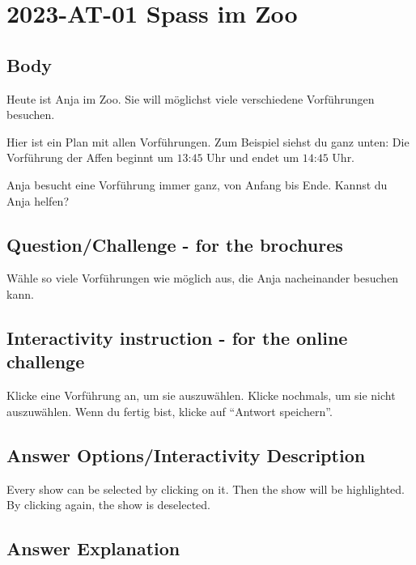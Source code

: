 \documentclass[a4paper,11pt]{report}
\newcommand{\taskGraphicsFolder}{..}
\begin{document}
\section*{\centering{} 2023-AT-01 Spass im Zoo}


\subsection*{Body}

Heute ist Anja im Zoo. Sie will möglichst viele verschiedene Vorführungen besuchen.

Hier ist ein Plan mit allen Vorführungen.
Zum Beispiel siehst du ganz unten:
Die Vorführung der Affen beginnt um $13$:$45$ Uhr und endet um $14$:$45$ Uhr.

{\centering%
\par}

Anja besucht eine Vorführung immer ganz, von Anfang bis Ende.
Kannst du Anja helfen?

{\em


\subsection*{Question/Challenge - for the brochures}

Wähle so viele Vorführungen wie möglich aus, die Anja nacheinander besuchen kann.

}


\subsection*{Interactivity instruction - for the online challenge}

Klicke eine Vorführung an, um sie auszuwählen. Klicke nochmals, um sie nicht auszuwählen. Wenn du fertig bist, klicke auf \enquote{Antwort speichern}.

\begingroup
\renewcommand{\arraystretch}{1.5}
\subsection*{Answer Options/Interactivity Description}

Every show can be selected by clicking on it. Then the show will be highlighted. By clicking again, the show is deselected.

\endgroup

\subsection*{Answer Explanation}
\end{document}
